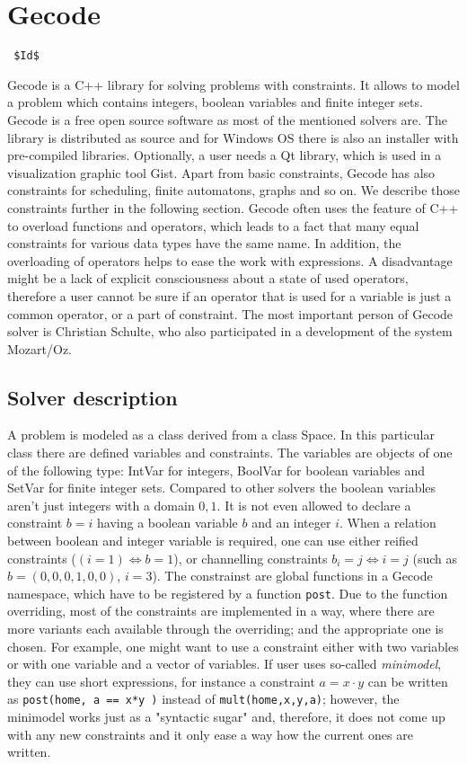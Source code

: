\section{Gecode}
\verb= $Id$ =

Gecode is a C++ library for solving problems with constraints. It allows to
model a problem which contains integers, boolean variables and finite integer sets. Gecode
is a free open source software as most of the mentioned solvers are. The library is
distributed as source and for Windows OS there is also an installer with
pre-compiled libraries. Optionally, a user needs a Qt library, which is used in 
a visualization graphic tool Gist. Apart from basic constraints, Gecode has also 
constraints for scheduling, finite automatons, graphs and so on. We describe those
constraints further in the following section. Gecode often uses the feature of C++
to overload functions and operators, which leads to a fact that many equal constraints for
various data types have the same name. In addition, the overloading of operators
helps to ease the work with expressions. A disadvantage might be a lack of explicit consciousness
about a state of used operators, therefore a user cannot be sure if an operator that is used 
for a variable is just a common operator, or a part of constraint. The most important person of Gecode 
solver is Christian Schulte, who also participated in a development of the system Mozart/Oz. 

\subsection{Solver description}
A problem is modeled as a class derived from a class Space. In this particular class
there are defined variables and constraints. The variables are objects of one of the following type:
IntVar for integers, BoolVar for boolean variables and SetVar for finite integer sets. 
Compared to other solvers the boolean variables aren't just integers with a domain ${0,1}$.
It is not even allowed to declare a constraint $b=i$ having a boolean variable $b$ and an integer $i$.
When a relation between boolean and integer variable is required, one can use either reified constraints
($(i = 1) \Leftrightarrow b = 1$), or channelling constraints $b_i = j \Leftrightarrow i = j$ (such as $b = (0,0,0,1,0,0)$, $i = 3$).
The constrainst are global functions in a Gecode namespace, which have to be registered by a function \texttt{post}.
Due to the function overriding, most of the constraints are implemented in a way, 
where there are more variants each available through the overriding; and the appropriate one is chosen.
For example, one might want to use a constraint either with two variables or with one variable and 
a vector of variables. If user uses so-called {\em minimodel}, they can use short expressions,
for instance a constraint $a = x \cdot y$ can be written as \texttt{post(home, a == x*y )} instead of \texttt{mult(home,x,y,a)}; 
however, the minimodel works just as a "syntactic sugar" and, therefore, it does not come up 
with any new constraints and it only ease a way how the current ones are written. 

